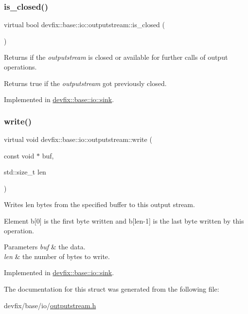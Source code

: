 \subsubsection{\texorpdfstring{is\+\_\+closed()}{is\_closed()}}
{\footnotesize\ttfamily virtual bool devfix\+::base\+::io\+::outputstream\+::is\+\_\+closed (\begin{DoxyParamCaption}{ }\end{DoxyParamCaption})\hspace{0.3cm}{\ttfamily [pure virtual]}}



Returns if the {\itshape outputstream} is closed or available for further calls of output operations. 

\begin{DoxyReturn}{Returns}
true if the {\itshape outputstream} got previously closed. 
\end{DoxyReturn}


Implemented in \hyperlink{structdevfix_1_1base_1_1io_1_1sink_a1e5782219f9256d8ff09385fa6f3b156}{devfix\+::base\+::io\+::sink}.

\mbox{\label{structdevfix_1_1base_1_1io_1_1outputstream_ac7e5fcd6883c7c8f53356a4eb8284c00}} 
\subsubsection{\texorpdfstring{write()}{write()}}
{\footnotesize\ttfamily virtual void devfix\+::base\+::io\+::outputstream\+::write (\begin{DoxyParamCaption}\item[{const void $\ast$}]{buf,  }\item[{std\+::size\+\_\+t}]{len }\end{DoxyParamCaption})\hspace{0.3cm}{\ttfamily [pure virtual]}}



Writes len bytes from the specified buffer to this output stream. 

Element b\mbox{[}0\mbox{]} is the first byte written and b\mbox{[}len-\/1\mbox{]} is the last byte written by this operation.


\begin{DoxyParams}{Parameters}
{\em buf} & the data. \\
\hline
{\em len} & the number of bytes to write. \\
\hline
\end{DoxyParams}


Implemented in \hyperlink{structdevfix_1_1base_1_1io_1_1sink_a6eade9933d316139e952b7a442f3c56d}{devfix\+::base\+::io\+::sink}.



The documentation for this struct was generated from the following file\+:\begin{DoxyCompactItemize}
\item 
devfix/base/io/\hyperlink{outputstream_8h}{outputstream.\+h}\end{DoxyCompactItemize}
